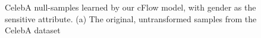 \begin{figure}[tb]
{      %
      \label{fig:cflow_celeba_recon_s}
  }
  \caption{
    CelebA null-samples learned by our cFlow model, with gender as the sensitive attribute.
    (a) The original, untransformed samples from the CelebA dataset
}
\end{figure}
